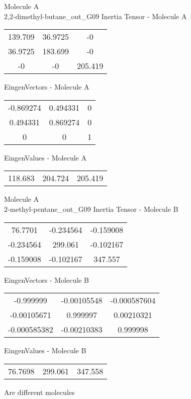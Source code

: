 \newpage
\begin{multicols}{2}
\begin{center}
Molecule A \\ 
2,2-dimethyl-butane_out_G09
Inertia Tensor - Molecule A \\
\vtab
\begin{tabular}{|c c c|}
139.709	 & 	36.9725	 & 	-0	 \\
36.9725	 & 	183.699	 & 	-0	 \\
-0	 & 	-0	 & 	205.419
\end{tabular}

\vtab
 EingenVectors - Molecule A     \\
\vtab
\begin{tabular}{|c c c|}
-0.869274	 & 	0.494331	 & 	0	 \\
0.494331	 & 	0.869274	 & 	0	 \\
0	 & 	0	 & 	1
\end{tabular}

\vtab
 EingenValues - Molecule A     \\
\vtab
\begin{tabular}{|c c c|}
118.683	 & 	204.724	 & 	205.419
\end{tabular}
\columnbreak
Molecule A \\ 
2-methyl-pentane_out_G09
Inertia Tensor - Molecule B \\
\vtab
\begin{tabular}{|c c c|}
76.7701	 & 	-0.234564	 & 	-0.159008	 \\
-0.234564	 & 	299.061	 & 	-0.102167	 \\
-0.159008	 & 	-0.102167	 & 	347.557
\end{tabular}

\vtab
 EingenVectors - Molecule B     \\
\vtab
\begin{tabular}{|c c c|}
-0.999999	 & 	-0.00105548	 & 	-0.000587604	 \\
-0.00105671	 & 	0.999997	 & 	0.00210321	 \\
-0.000585382	 & 	-0.00210383	 & 	0.999998
\end{tabular}

\vtab
 EingenValues - Molecule B     \\
\vtab
\begin{tabular}{|c c c|}
76.7698	 & 	299.061	 & 	347.558
\end{tabular}
\textcolor{NavyBlue}{\large Are different molecules}
\end{center}
\end{multicols}
